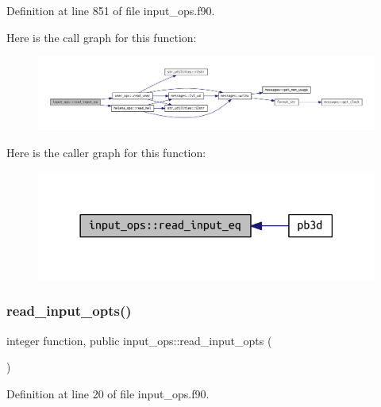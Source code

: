 Definition at line 851 of file input\+\_\+ops.\+f90.

Here is the call graph for this function\+:
\nopagebreak
\begin{figure}[H]
\begin{center}
\leavevmode
\includegraphics[width=350pt]{namespaceinput__ops_a577c897cc266961eb40bb5ef747fa077_cgraph}
\end{center}
\end{figure}
Here is the caller graph for this function\+:
\nopagebreak
\begin{figure}[H]
\begin{center}
\leavevmode
\includegraphics[width=318pt]{namespaceinput__ops_a577c897cc266961eb40bb5ef747fa077_icgraph}
\end{center}
\end{figure}
\mbox{\label{namespaceinput__ops_a434acca4f59f9dc1d91e04f846133684}} 
\subsubsection{\texorpdfstring{read\+\_\+input\+\_\+opts()}{read\_input\_opts()}}
{\footnotesize\ttfamily integer function, public input\+\_\+ops\+::read\+\_\+input\+\_\+opts (\begin{DoxyParamCaption}{ }\end{DoxyParamCaption})}



Definition at line 20 of file input\+\_\+ops.\+f90.

